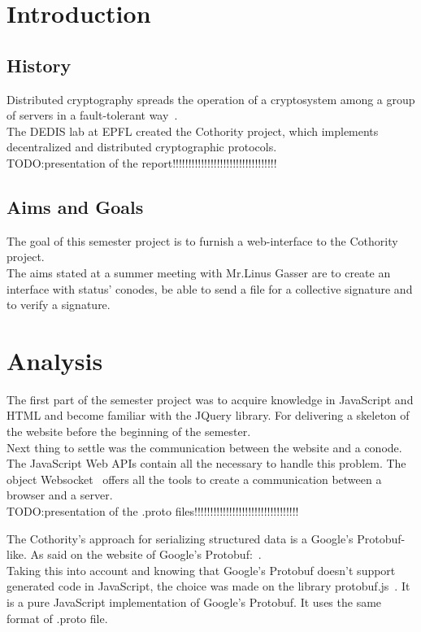\documentclass[11pt, a4paper, twoside, openright]{book} %
\begin{document}


\begingroup
\let\cleardoublepage\clearpage
\tableofcontents
\endgroup

\chapter{Introduction}
\section{History}
Distributed cryptography spreads the operation of a cryptosystem among a group
of servers in a fault-tolerant way~\cite{definition}.\\
The DEDIS lab at EPFL created the Cothority project, which implements decentralized
and distributed cryptographic protocols.\\

TODO:presentation of the report!!!!!!!!!!!!!!!!!!!!!!!!!!!!!!!!!

\section{Aims and Goals}
The goal of this semester project is to furnish a web-interface to the Cothority
project.\\
The aims stated at a summer meeting with Mr.Linus Gasser are to create an
interface with status' conodes, be able to send a file for a collective signature
and to verify a signature.\\


\chapter{Analysis}
The first part of the semester project was to acquire knowledge in JavaScript and
HTML and become familiar with the JQuery library. For delivering a skeleton of
the website before the beginning of the semester.\\
Next thing to settle was the communication between the website and a conode.
The JavaScript Web APIs contain all the necessary to handle this problem.
The object Websocket~\cite{websocketPage} offers all the tools to create a
communication between a browser and a server.\\

TODO:presentation of the .proto files!!!!!!!!!!!!!!!!!!!!!!!!!!!!!!!!!


The Cothority's approach for serializing structured data is a Google's Protobuf-like.
As said on the website of Google's Protobuf:~\cite{protobufDefi}.\\
Taking this into account and knowing that Google's Protobuf doesn't support generated
code in JavaScript, the choice was made on the library protobuf.js~\cite{protobufjs}.
It is a pure JavaScript implementation of Google's Protobuf. It uses the same format
of .proto file.
\end{document}
